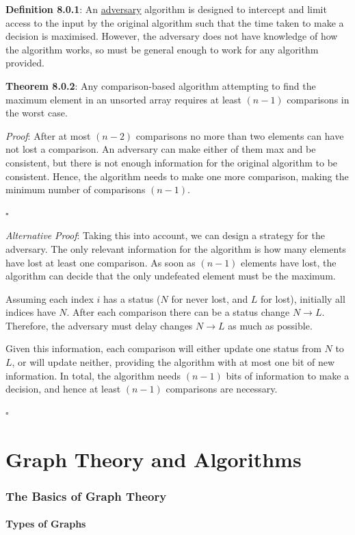 \documentclass{article}
\newcommand{\separate}[1] {\vspace{#1 pt}\noindent}
\newcommand{\definition}[2]{\textbf{Definition #1}: #2\label{def:#1}}
\newcommand{\proof}[2]{\textit{Proof}: #2 \begin{flushright}\(\square\)\end{flushright}\label{prf:#1}}
\newcommand{\theorem}[3]{\textbf{Theorem #1}: #2 \par\separate{3}\proof{thm:#1}{#3}\label{thm:#1}}
\begin{document}
\separate{5}\definition{8.0.1}{An \underline{adversary} algorithm is designed to intercept and limit access to the input by the original algorithm such that the time taken to make a decision is maximised. However, the adversary does not have knowledge of how the algorithm works, so must be general enough to work for any algorithm provided.}

\separate{5}\theorem{8.0.2}{Any comparison-based algorithm attempting to find the maximum element in an unsorted array requires at least \((n-1)\) comparisons in the worst case.}
{After at most \((n-2)\) comparisons no more than two elements can have not lost a comparison. An adversary can make either of them max and be consistent, but there is not enough information for the original algorithm to be consistent. Hence, the algorithm needs to make one more comparison, making the minimum number of comparisons \((n-1)\).}
\textit{Alternative }\proof{alt:thm:8.0.2}{Taking this into account, we can design a strategy for the adversary. The only relevant information for the algorithm is how many elements have lost at least one comparison. As soon as \((n-1)\) elements have lost, the algorithm can decide that the only undefeated element must be the maximum. 

Assuming each index \(i\) has a status (\(N\) for never lost, and \(L\) for lost), initially all indices have \(N\). After each comparison there can be a status change \(N\rightarrow L\). Therefore, the adversary must delay changes \(N\rightarrow L\) as much as possible. 

Given this information, each comparison will either update one status from \(N\) to \(L\), or will update neither, providing the algorithm with at most one bit of new information. In total, the algorithm needs \((n-1)\) bits of information to make a decision, and hence at least \((n-1)\) comparisons are necessary.}

\newpage\part{Graph Theory and Algorithms}\label{part:4.gta}

\section{The Basics of Graph Theory}

\subsection{Types of Graphs}
\end{document}
